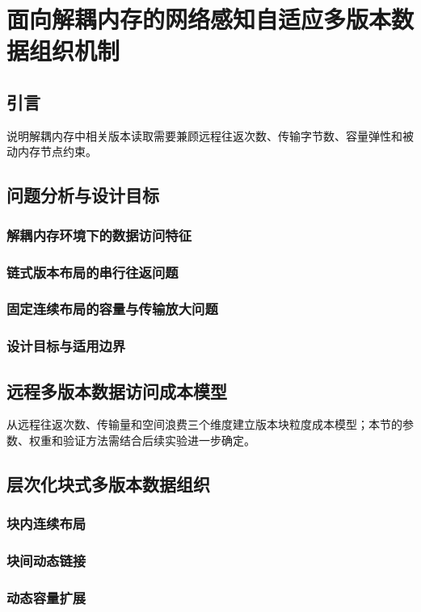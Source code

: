 \chapter{面向解耦内存的网络感知自适应多版本数据组织机制}

\section{引言}
说明解耦内存中相关版本读取需要兼顾远程往返次数、传输字节数、容量弹性和被动内存节点约束。
\section{问题分析与设计目标}
\subsection{解耦内存环境下的数据访问特征}
\subsection{链式版本布局的串行往返问题}
\subsection{固定连续布局的容量与传输放大问题}
\subsection{设计目标与适用边界}

\section{远程多版本数据访问成本模型}
从远程往返次数、传输量和空间浪费三个维度建立版本块粒度成本模型；本节的参数、权重和验证方法需结合后续实验进一步确定。
\section{层次化块式多版本数据组织}
\subsection{块内连续布局}
\subsection{块间动态链接}
\subsection{动态容量扩展}
